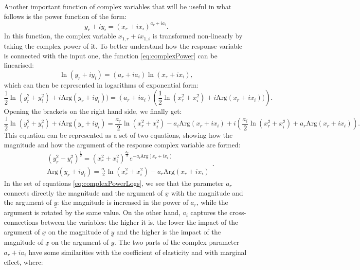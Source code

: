 \documentclass[
]{book}
\begin{document}
Another important function of complex variables that will be useful in what follows is the power function of the form:
\begin{equation}
    y_r + i y_i = (x_{r} + i x_{i}) ^{a_{r} + i a_{i}} .
    \label{eq:complexPower}
\end{equation}
In this function, the complex variable \(x_{1,r} + i x_{1,i}\) is transformed non-linearly by taking the complex power of it. To better understand how the response variable is connected with the input one, the function \eqref{eq:complexPower} can be linearised:
\begin{equation*}
    \ln (y_r + i y_i) = (a_{r} + i a_{i}) \ln (x_{r} + i x_{i}) ,
\end{equation*}
which can then be represented in logarithms of exponential form:
\begin{equation*}
    \frac{1}{2} \ln \left({y_r^2 + y_i^2}\right) + {i \mathrm{Arg}(y_r + i y_i)}) = (a_{r} + i a_{i}) \left(\frac{1}{2} \ln \left({x_r^2 + x_i^2}\right) + {i \mathrm{Arg}(x_r + i x_i)})\right) .
\end{equation*}
Opening the brackets on the right hand side, we finally get:
\begin{equation*}
    \frac{1}{2} \ln \left({y_r^2 + y_i^2}\right) + {i \mathrm{Arg}(y_r + i y_i)} = \frac{a_{r}}{2} \ln \left({x_r^2 + x_i^2}\right) - a_{i} \mathrm{Arg}(x_r + i x_i) + i \left(\frac{a_{i}}{2} \ln \left({x_r^2 + x_i^2}\right) + a_r \mathrm{Arg}(x_r + i x_i)  \right) .
\end{equation*}
This equation can be represented as a set of two equations, showing how the magnitude and how the argument of the response complex variable are formed:
\begin{equation}
    \begin{aligned}
        & \left({y_r^2 + y_i^2}\right)^{\frac{1}{2}} = \left({x_r^2 + x_i^2}\right)^{\frac{a_{r}}{2}} e^{- a_{i} \mathrm{Arg}(x_r + i x_i)} \\
        & \mathrm{Arg}(y_r + i y_i) = \frac{a_{i}}{2} \ln \left({x_r^2 + x_i^2}\right) + a_r \mathrm{Arg}(x_r + i x_i)
    \end{aligned} .
    \label{eq:complexPowerLogs}
\end{equation}
In the set of equations \eqref{eq:complexPowerLogs}, we see that the parameter \(a_r\) connects directly the magnitude and the argument of \(\underline{x}\) with the magnitude and the argument of \(\underline{y}\): the magnitude is increased in the power of \(a_r\), while the argument is rotated by the same value. On the other hand, \(a_i\) captures the cross-connections between the variables: the higher it is, the lower the impact of the argument of \(\underline{x}\) on the magnitude of \(\underline{y}\) and the higher is the impact of the magnitude of \(\underline{x}\) on the argument of \(\underline{y}\). The two parts of the complex parameter \(a_r + i a_i\) have some similarities with the coefficient of elasticity and with marginal effect, where:
\end{document}
